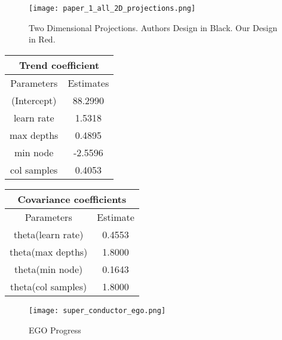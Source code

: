 \documentclass[12pt]{article}
\begin{document}
  \begin{figure}[!hbtp]
\centering
\texttt{[image: paper\_1\_all\_2D\_projections.png]}
\caption{ Two Dimensional Projections. Authors Design in Black. Our Design in Red.}
\end{figure}


\vspace*{2.5cm}


 
 \begin{minipage}[c]{0.5\textwidth}
 \centering
 \begin{tabular}{| c  c |} 
 \multicolumn{2}{c}{Trend  coefficient} \\

  \hline 
  Parameters & Estimates \\
 \hline 
(Intercept)   & 88.2990 \\
  learn rate  &   1.5318 \\
  max depths  &   0.4895 \\
    min node  &  -2.5596 \\
 col samples  &   0.4053 \\

 \hline
 \end{tabular}
\end{minipage}
\begin{minipage}[c]{0.5\textwidth}
 \centering
 \begin{tabular}{| c c |} 
 \multicolumn{2}{c}{Covariance coefficients} \\
 \hline
  Parameters &                   Estimate \\
  \hline
 theta(learn rate)   &  0.4553\\
 theta(max depths)   &  1.8000\\
   theta(min node)   &  0.1643\\
theta(col samples)  &   1.8000\\
\hline
 \end{tabular}
\end{minipage}

 \vspace*{2.5cm}
 
  \begin{figure}[!hbtp]
\centering
\texttt{[image: super\_conductor\_ego.png]}
\caption{EGO Progress}
\end{figure}
 

 
\end{document}
